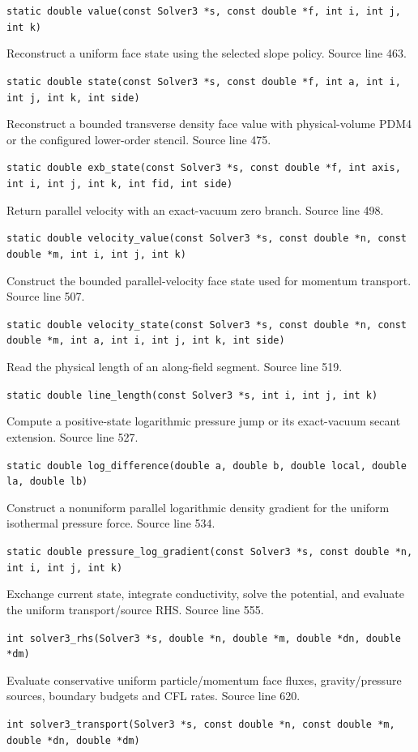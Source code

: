 \begin{description}[style=nextline,leftmargin=0pt,labelindent=0pt,labelwidth=0pt,labelsep=0pt]
{\small\nolinkurl{static double value(const Solver3 *s, const double *f, int i, int j, int k)}}
\item[\texttt{state}] Reconstruct a uniform face state using the selected slope policy. Source line 463.\par
{\small\nolinkurl{static double state(const Solver3 *s, const double *f, int a, int i, int j, int k, int side)}}
\item[\texttt{exb\_state}] Reconstruct a bounded transverse density face value with physical-volume PDM4 or the configured lower-order stencil. Source line 475.\par
{\small\nolinkurl{static double exb_state(const Solver3 *s, const double *f, int axis, int i, int j, int k, int fid, int side)}}
\item[\texttt{velocity\_value}] Return parallel velocity with an exact-vacuum zero branch. Source line 498.\par
{\small\nolinkurl{static double velocity_value(const Solver3 *s, const double *n, const double *m, int i, int j, int k)}}
\item[\texttt{velocity\_state}] Construct the bounded parallel-velocity face state used for momentum transport. Source line 507.\par
{\small\nolinkurl{static double velocity_state(const Solver3 *s, const double *n, const double *m, int a, int i, int j, int k, int side)}}
\item[\texttt{line\_length}] Read the physical length of an along-field segment. Source line 519.\par
{\small\nolinkurl{static double line_length(const Solver3 *s, int i, int j, int k)}}
\item[\texttt{log\_difference}] Compute a positive-state logarithmic pressure jump or its exact-vacuum secant extension. Source line 527.\par
{\small\nolinkurl{static double log_difference(double a, double b, double local, double la, double lb)}}
\item[\texttt{pressure\_log\_gradient}] Construct a nonuniform parallel logarithmic density gradient for the uniform isothermal pressure force. Source line 534.\par
{\small\nolinkurl{static double pressure_log_gradient(const Solver3 *s, const double *n, int i, int j, int k)}}
\item[\texttt{solver3\_rhs}] Exchange current state, integrate conductivity, solve the potential, and evaluate the uniform transport/source RHS. Source line 555.\par
{\small\nolinkurl{int solver3_rhs(Solver3 *s, double *n, double *m, double *dn, double *dm)}}
\item[\texttt{solver3\_transport}] Evaluate conservative uniform particle/momentum face fluxes, gravity/pressure sources, boundary budgets and CFL rates. Source line 620.\par
{\small\nolinkurl{int solver3_transport(Solver3 *s, const double *n, const double *m, double *dn, double *dm)}}
\end{description}
